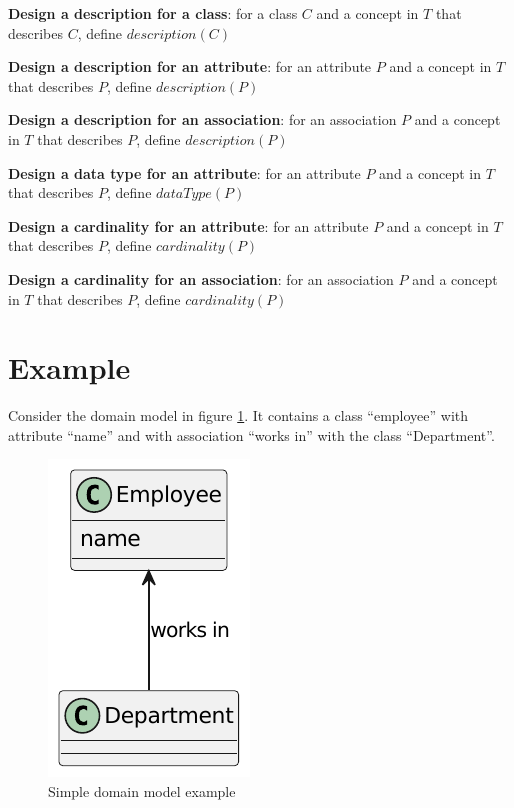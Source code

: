 \textbf{Design a description for a class}:
for a class $C$ and a concept in $T$ that describes $C$, define $description(C)$

\textbf{Design a description for an attribute}:
for an attribute $P$ and a concept in $T$ that describes $P$, define $description(P)$

\textbf{Design a description for an association}:
for an association $P$ and a concept in $T$ that describes $P$, define $description(P)$

\textbf{Design a data type for an attribute}:
for an attribute $P$ and a concept in $T$ that describes $P$, define $dataType(P)$

\textbf{Design a cardinality for an attribute}:
for an attribute $P$ and a concept in $T$ that describes $P$, define $cardinality(P)$

\textbf{Design a cardinality for an association}:
for an association $P$ and a concept in $T$ that describes $P$, define $cardinality(P)$


\section{Example}

Consider the domain model in figure \ref{fig:modeling-steps}. It contains a class ``employee'' with attribute ``name'' and with association ``works in'' with the class ``Department''.

\begin{figure}[!h]
    \centering
    \includegraphics[scale=1.00]{img/domain-modeling-steps-example.pdf}
    \caption{\centering Simple domain model example}
    \label{fig:modeling-steps}
\end{figure}

